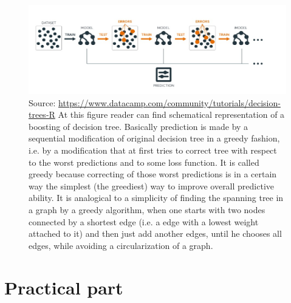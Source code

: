 \documentclass[12pt, twoside]{book} %
\begin{document}
\begin{figure}[H]
\includegraphics[width=\textwidth]{boosting_scheme.jpg}
{\small Source: \url{https://www.datacamp.com/community/tutorials/decision-trees-R} \newline
At this figure reader can find schematical representation of a boosting of decision tree. Basically prediction is made by a sequential modification of original decision tree in a greedy fashion, i.e. by a modification that at first tries to correct tree with respect to the worst predictions and to some loss function. It is called greedy because correcting of those worst predictions is in a certain way the simplest (the greediest) way to improve overall predictive ability. It is analogical to a simplicity of finding the spanning tree in a graph by a greedy algorithm, when one starts with two nodes connected by a shortest edge (i.e. a edge with a lowest weight attached to it) and then just add another edges, until he chooses all edges, while avoiding a circularization of a graph. }
\end{figure}




\chapter{Practical part}        %
\label{2}
\end{document}
